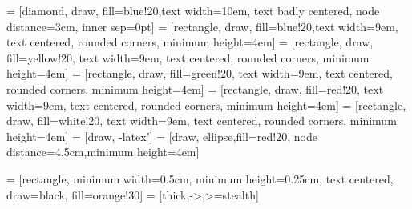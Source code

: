 \usepackage{booktabs} %



 \setlength {\marginparwidth }{2cm} 
 \usepackage{todonotes}
 \usepackage[normalem]{ulem}

\usepackage{verbatim}


\usepackage{graphicx}

\usepackage{svg}




\usepackage{tikz}
\def\checkmark{\tikz\fill[scale=0.4](0,.35) -- (.25,0) -- (1,.7) -- (.25,.15) -- cycle;} 
\usetikzlibrary{shapes.geometric, arrows}

 = [diamond, draw, fill=blue!20,text width=10em, text badly centered, node distance=3cm, inner sep=0pt]
 = [rectangle, draw, fill=blue!20,text width=9em, text centered, rounded corners, minimum height=4em]
 = [rectangle, draw, fill=yellow!20, text width=9em, text centered, rounded corners, minimum height=4em]
 = [rectangle, draw, fill=green!20, text width=9em, text centered, rounded corners, minimum height=4em]
 = [rectangle, draw, fill=red!20, text width=9em, text centered, rounded corners, minimum height=4em]
 = [rectangle, draw, fill=white!20, text width=9em, text centered, rounded corners, minimum height=4em]
 = [draw, -latex']
 = [draw, ellipse,fill=red!20, node distance=4.5cm,minimum height=4em]

 = [rectangle, minimum width=0.5cm, minimum height=0.25cm, text centered, draw=black, fill=orange!30]
 = [thick,->,>=stealth]

\usepackage{pstricks}